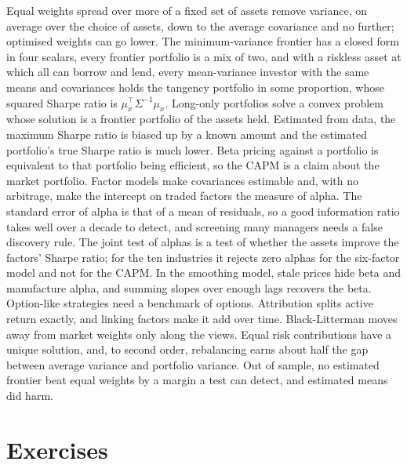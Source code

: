 \begin{chapterrefs}
Equal weights spread over more of a fixed set of assets remove variance, on average over the choice
of assets, down to the average covariance and no further; optimised weights can go lower. The minimum-variance
frontier has a closed form in four scalars, every frontier portfolio is a mix of two, and with a
riskless asset at which all can borrow and lend, every mean-variance investor with the same means
and covariances holds the tangency portfolio in some proportion, whose squared Sharpe ratio is
$\mu_x^\top\Sigma^{-1}\mu_x$. Long-only portfolios solve a convex problem whose solution is a frontier
portfolio of the assets held. Estimated from data, the maximum Sharpe ratio is biased up by a known amount and
the estimated portfolio's true Sharpe ratio is much lower. Beta pricing against a portfolio is
equivalent to that portfolio being efficient, so the CAPM is a claim about the market portfolio. Factor
models make covariances estimable and, with no arbitrage, make the intercept on traded factors the
measure of alpha. The standard error of alpha is that of a mean of residuals, so a good information
ratio takes well over a decade to detect, and screening many managers needs a false discovery rule.
The joint test of alphas is a test of whether the assets improve the factors' Sharpe ratio; for the
ten industries it rejects zero alphas for the six-factor model and not for the CAPM. In the smoothing model, stale prices hide
beta and manufacture alpha, and summing slopes over enough lags recovers the beta. Option-like strategies need a benchmark of options.
Attribution splits active return exactly, and linking factors make it add over time. Black-Litterman
moves away from market weights only along the views. Equal risk contributions have a unique solution,
and, to second order, rebalancing earns about half the gap between average variance and portfolio variance. Out of sample, no
estimated frontier beat equal weights by a margin a test can detect, and estimated means did harm.

\FloatBarrier
\section{Exercises}
\label{sec7:exercises}


\end{chapterrefs}
